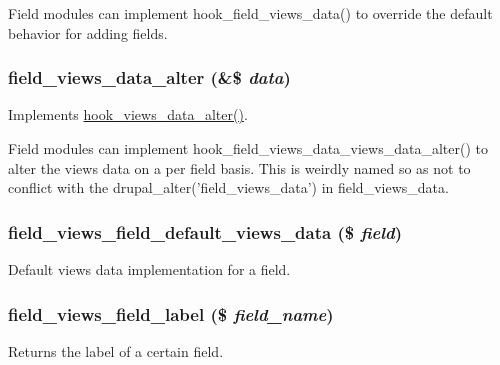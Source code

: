 Field modules can implement hook\_\-field\_\-views\_\-data() to override the default behavior for adding fields. \hypertarget{field_8views_8inc_a08484225a12bde8e9e4a23c519ff4fd8}{
\subsubsection[{field\_\-views\_\-data\_\-alter}]{\setlength{\rightskip}{0pt plus 5cm}field\_\-views\_\-data\_\-alter (\&\$ {\em data})}}
\label{field_8views_8inc_a08484225a12bde8e9e4a23c519ff4fd8}
Implements \hyperlink{group__views__hooks_ga6ae0bb0d2385e03c32b57625b6d35826}{hook\_\-views\_\-data\_\-alter()}.

Field modules can implement hook\_\-field\_\-views\_\-data\_\-views\_\-data\_\-alter() to alter the views data on a per field basis. This is weirdly named so as not to conflict with the drupal\_\-alter('field\_\-views\_\-data') in field\_\-views\_\-data. \hypertarget{field_8views_8inc_adbb71dc4cb1642151e243f305ba34223}{
\subsubsection[{field\_\-views\_\-field\_\-default\_\-views\_\-data}]{\setlength{\rightskip}{0pt plus 5cm}field\_\-views\_\-field\_\-default\_\-views\_\-data (\$ {\em field})}}
\label{field_8views_8inc_adbb71dc4cb1642151e243f305ba34223}
Default views data implementation for a field. \hypertarget{field_8views_8inc_a37ebb9b2c6dcf5c93062f4f96c6c1f0f}{
\subsubsection[{field\_\-views\_\-field\_\-label}]{\setlength{\rightskip}{0pt plus 5cm}field\_\-views\_\-field\_\-label (\$ {\em field\_\-name})}}
\label{field_8views_8inc_a37ebb9b2c6dcf5c93062f4f96c6c1f0f}
Returns the label of a certain field.

